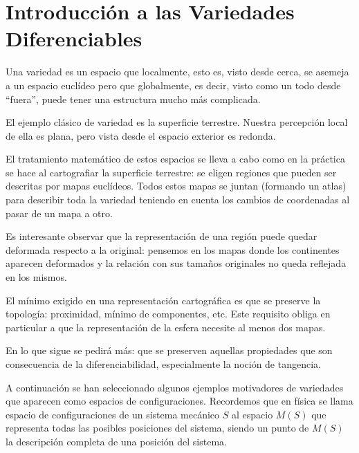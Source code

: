 \documentclass[\main/VD_completo.tex]{subfiles}
\begin{document}
\setcounter{chapter}{-1}

\chapter[Introducción]{Introducción a las Variedades Diferenciables}
\label{chap:intro}

Una variedad es un espacio que localmente, esto es, visto desde cerca, se
asemeja a un espacio euclídeo pero que globalmente, es decir, visto como un todo
desde ``fuera'', puede tener una estructura mucho más complicada.

El ejemplo clásico de variedad es la superficie terrestre. Nuestra percepción
local de ella es plana, pero vista desde el espacio exterior es redonda.

El tratamiento matemático de estos espacios se lleva a cabo como en la práctica
se hace al cartografiar la superficie terrestre: se eligen regiones que pueden
ser descritas por mapas euclídeos. Todos estos mapas se juntan (formando un
atlas) para describir toda la variedad teniendo en cuenta los cambios de
coordenadas al pasar de un mapa a otro.

Es interesante observar que la representación de una región puede quedar
deformada respecto a la original: pensemos en los mapas donde los continentes
aparecen deformados y la relación con sus tamaños originales no queda reflejada
en los mismos.

El mínimo exigido en una representación cartográfica es que se preserve la
topología: proximidad, mínimo de componentes, etc. Este requisito obliga en
particular a que la representación de la esfera necesite al menos dos mapas.

En lo que sigue se pedirá más: que se preserven aquellas propiedades que son
consecuencia de la diferenciabilidad, especialmente la noción de tangencia.

A continuación se han seleccionado algunos ejemplos motivadores de variedades
que aparecen como espacios de configuraciones. Recordemos que en física se llama
espacio de configuraciones de un sistema mecánico $S$ al espacio $M(S)$ que
representa todas las posibles posiciones del sistema, siendo un punto de $M(S)$
la descripción completa de una posición del sistema.
\end{document}
